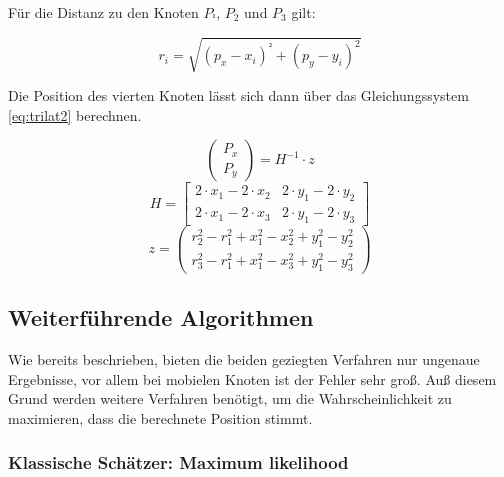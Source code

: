 Für die Distanz zu den Knoten $P_{¹}$, $P_{2}$ und $P_{3}$ gilt:

\begin{framed}
\begin{equation}
  \label{eq:trilat1}
  r_{i} = \sqrt{(p_{x} - x_{i})^{²} + (p_{y} - y_{i})^{2}}
\end{equation}
\end{framed}

Die Position des vierten Knoten lässt sich dann über das
Gleichungssystem \ref{eq:trilat2} berechnen.

\begin{framed}
\begin{equation}
  \label{eq:trilat2}
  \begin{pmatrix}
    P_{x} \\
    P_{y}
  \end{pmatrix}
  =
  H^{-1} \cdot z
\end{equation}
\begin{equation*}
  H = 
  \begin{bmatrix}
    2 \cdot x_{1} - 2 \cdot x_{2} & 2 \cdot y_{1} - 2 \cdot y_{2} \\
    2 \cdot x_{1} - 2 \cdot x_{3} & 2 \cdot y_{1} - 2 \cdot y_{3}
  \end{bmatrix}
\end{equation*}
\begin{equation*}
  z = 
  \begin{pmatrix}
    r_{2}^2 - r_{1}^2 + x_{1}^2 - x_{2}^2 + y_{1}^2 - y_{2}^2 \\
    r_{3}^2 - r_{1}^2 + x_{1}^2 - x_{3}^2 + y_{1}^2 - y_{3}^2
  \end{pmatrix}
\end{equation*}
\end{framed}


\subsection{Weiterführende Algorithmen}

Wie bereits beschrieben, bieten die beiden geziegten Verfahren nur
ungenaue Ergebnisse, vor allem bei mobielen Knoten ist der Fehler sehr
groß. Auß diesem Grund werden weitere Verfahren benötigt, um die
Wahrscheinlichkeit zu maximieren, dass die berechnete Position stimmt.


\subsubsection{Klassische Schätzer: Maximum likelihood}

